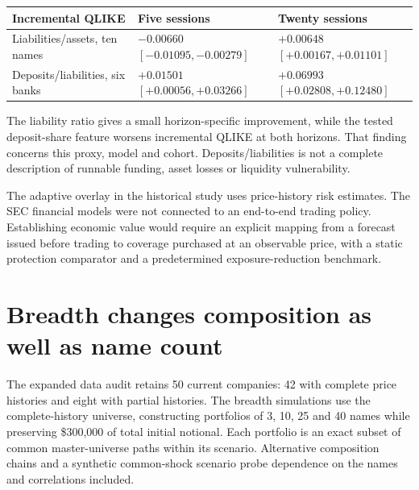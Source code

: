 \documentclass[11pt,a4paper]{article}
\begin{document}
\begin{center}\small
\begin{tabular}{@{}p{.34\linewidth}p{.27\linewidth}p{.29\linewidth}@{}}\toprule
Incremental QLIKE & Five sessions & Twenty sessions\\\midrule
Liabilities/assets, ten names & $-0.00660$\newline $[-0.01095,-0.00279]$ & $+0.00648$\newline $[+0.00167,+0.01101]$\\[5pt]
Deposits/liabilities, six banks & $+0.01501$\newline $[+0.00056,+0.03266]$ & $+0.06993$\newline $[+0.02808,+0.12480]$\\\bottomrule
\end{tabular}\end{center}

The liability ratio gives a small horizon-specific improvement, while the tested deposit-share feature worsens incremental QLIKE at both horizons. That finding concerns this proxy, model and cohort. Deposits/liabilities is not a complete description of runnable funding, asset losses or liquidity vulnerability.

The adaptive overlay in the historical study uses price-history risk estimates. The SEC financial models were not connected to an end-to-end trading policy. Establishing economic value would require an explicit mapping from a forecast issued before trading to coverage purchased at an observable price, with a static protection comparator and a predetermined exposure-reduction benchmark.

\nextpage
\section*{Breadth changes composition as well as name count}
The expanded data audit retains 50 current companies: 42 with complete price histories and eight with partial histories. The breadth simulations use the complete-history universe, constructing portfolios of 3, 10, 25 and 40 names while preserving \$300,000 of total initial notional. Each portfolio is an exact subset of common master-universe paths within its scenario. Alternative composition chains and a synthetic common-shock scenario probe dependence on the names and correlations included.
\end{document}
